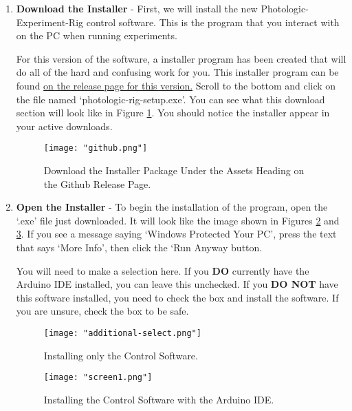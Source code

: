 \documentclass{article}
\begin{document}
\begin{enumerate}
    \item \textbf{Download the Installer} - First, we will install the new Photologic-Experiment-Rig control software. This is the program that you interact with on the PC when running experiments. 
        \par For this version of the software, 
        a installer program has been created that will do all of the hard and confusing work for you. This installer program can be found 
        \href{https://github.com/blakehourigan/Photologic-Experiment-Rig/releases/tag/v1.0}{on the release page for this version.}  Scroll to the bottom and click on the file named `photologic-rig-setup.exe'. 
        You can see what this download section will look like in Figure \ref{fig:github}. You should notice the installer appear in your active downloads.

        \begin{figure}[h!]
            \centering
            \texttt{[image: "github.png"]}
            \caption{Download the Installer Package Under the Assets Heading on the Github Release Page.}
            \label{fig:github}
        \end{figure}

        \newpage    
    \item \textbf{Open the Installer} - To begin the installation of the program, open the `.exe' file just downloaded. It will look like the image shown in Figures \ref{fig:cont-ide}
        and \ref{fig:cont-no-ide}. If you see a message saying `Windows Protected Your PC', press the text that says `More Info', then click the `Run Anyway button. 
        \par You will need to make a selection here. If you \textbf{DO} currently have the Arduino IDE installed, you can leave this unchecked. If you \textbf{DO NOT}
        have this software installed, you need to check the box and install the software. If you are unsure, check the box to be safe.

        \begin{figure}[h!]
            \centering
            \texttt{[image: "additional-select.png"]}
            \caption{Installing only the Control Software.}
            \label{fig:cont-ide}
        \end{figure}

        \begin{figure}[h!]
            \centering
            \texttt{[image: "screen1.png"]}
            \caption{Installing the Control Software with the Arduino IDE.}
            \label{fig:cont-no-ide}
        \end{figure}
        \FloatBarrier


\end{enumerate}
\end{document}
